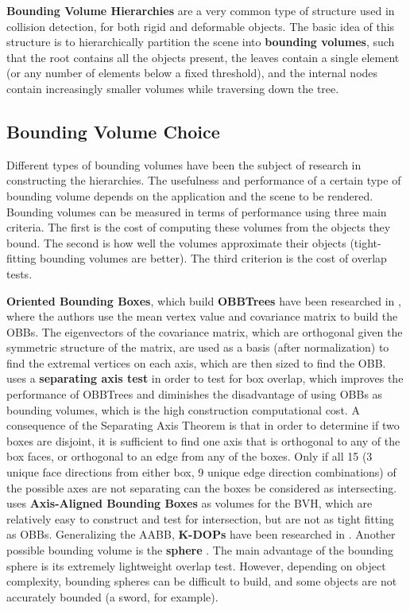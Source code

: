 \textbf{Bounding Volume Hierarchies} are a very common type of structure used in collision detection, for both rigid and deformable objects. The basic idea of this structure is to hierarchically partition the scene into \textbf{bounding volumes}, such that the root contains all the objects present, the leaves contain a single element (or any number of elements below a fixed threshold), and the internal nodes contain increasingly smaller volumes while traversing down the tree.

\subsection{Bounding Volume Choice}
\label{sub-sec:bvc}

Different types of bounding volumes have been the subject of research in constructing the hierarchies. The usefulness and performance of a certain type of bounding volume depends on the application and the scene to be rendered. Bounding volumes can be measured in terms of performance using three main criteria. The first is the cost of computing these volumes from the objects they bound. The second is how well the volumes approximate their objects (tight-fitting bounding volumes are better). The third criterion is the cost of overlap tests.



\FloatBarrier

\textbf{Oriented Bounding Boxes}, which build \textbf{OBBTrees} have been researched in \citep{gott96}, where the authors use the mean vertex value and covariance matrix to build the OBBs. The eigenvectors of the covariance matrix, which are orthogonal given the symmetric structure of the matrix, are used as a basis (after normalization) to find the extremal vertices on each axis, which are then sized to find the OBB.
\citep{gott96} uses a \textbf{separating axis test} in order to test for box overlap, which improves the performance of OBBTrees and diminishes the disadvantage of using OBBs as bounding volumes, which is the high construction computational cost. A consequence of the Separating Axis Theorem is that in order to determine if two boxes are disjoint, it is sufficient to find one axis that is orthogonal to any of the box faces, or orthogonal to an edge from any of the boxes. Only if all 15 (3 unique face directions from either box, 9 unique edge direction combinations) of the possible axes are not separating can the boxes be considered as intersecting. \citep{vdb97} uses \textbf{Axis-Aligned Bounding Boxes} as volumes for the BVH, which are relatively easy to construct and test for intersection, but are not as tight fitting as OBBs. Generalizing the AABB, \textbf{K-DOPs} have been researched in \citep{klo98}. Another possible bounding volume is the \textbf{sphere} \citep{hub96, rtsd01}. The main advantage of the bounding sphere is its extremely lightweight overlap test. However, depending on object complexity, bounding spheres can be difficult to build, and some objects are not accurately bounded (a sword, for example).

